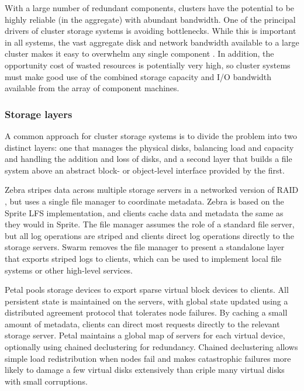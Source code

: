 With a large number of redundant components, clusters have the potential to be highly reliable (in the aggregate) with abundant bandwidth. One of the principal drivers of cluster storage systems is avoiding bottlenecks. While this is important in all systems, the vast aggregate disk and network bandwidth available to a large cluster makes it easy to overwhelm any single component \cite{hospodor}. In addition, the opportunity cost of wasted resources is potentially very high, so cluster systems must make good use of the combined storage capacity and I/O bandwidth available from the array of component machines.

\subsubsection{Storage layers}\label{sec:storage-layer-systems}

A common approach for cluster storage systems is to divide the problem into two distinct layers: one that manages the physical disks, balancing load and capacity and handling the addition and loss of disks, and a second layer that builds a file system above an abstract block- or object-level interface provided by the first.

Zebra \cite{hartman93} stripes data across multiple storage servers in a networked version of RAID \cite{patterson}, but uses a single file manager to coordinate metadata. Zebra is based on the Sprite LFS implementation, and clients cache data and metadata the same as they would in Sprite. The file manager assumes the role of a standard file server, but all log operations are striped and clients direct log operations directly to the storage servers. Swarm \cite{hartman99} removes the file manager to present a standalone layer that exports striped logs to clients, which can be used to implement local file systems or other high-level services.

Petal \cite{lee95,lee96} pools storage devices to export sparse virtual block devices to clients. All persistent state is maintained on the servers, with global state updated using a distributed agreement protocol that tolerates node failures. By caching a small amount of metadata, clients can direct most requests directly to the relevant storage server. Petal maintains a global map of servers for each virtual device, optionally using chained declustering for redundancy. Chained declustering \cite{hsiao} allows simple load redistribution when nodes fail and makes catastrophic failures more likely to damage a few virtual disks extensively than criple many virtual disks with small corruptions.

